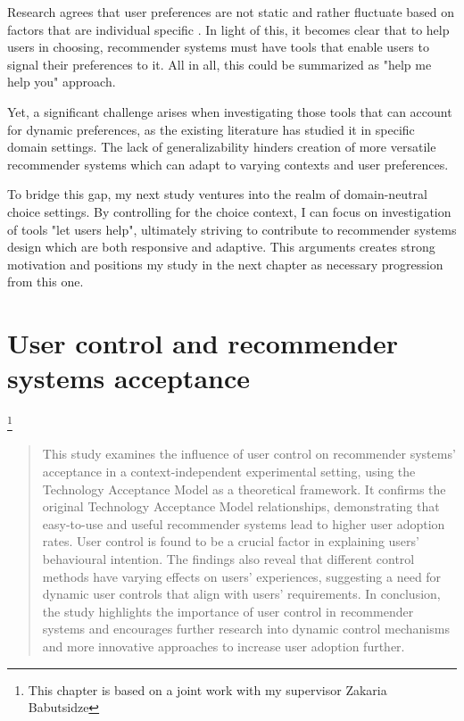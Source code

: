 \documentclass[a4paper,12pt]{article}
\begin{document}
Research agrees that user preferences are not static and rather fluctuate based on factors that are individual specific \citep{songWhenHowDiversify2019}. In light of this, it becomes clear that to help users in choosing, recommender systems must have tools that enable users to signal their preferences to it. All in all, this could be summarized as "help me help you" approach.

Yet, a significant challenge arises when investigating those tools that can account for dynamic preferences, as the existing literature has studied it in specific domain settings. The lack of generalizability hinders creation of more versatile recommender systems which can adapt to varying contexts and user preferences. 

To bridge this gap, my next study ventures into the realm of domain-neutral choice settings. By controlling for the choice context, I can focus on investigation of tools "let users help", ultimately striving to contribute to recommender systems design which are both responsive and adaptive. This arguments creates strong motivation and positions my study in the next chapter as necessary progression from this one.


\newpage


\section{User control and recommender systems acceptance}\label{chapter:UserControlAndRS}\footnote{This chapter is based on a joint work with my supervisor Zakaria Babutsidze}

\begin{abstract}

    This study examines the influence of user control on recommender systems' acceptance in a context-independent experimental setting, using the Technology Acceptance Model as a theoretical framework. It confirms the original  Technology Acceptance Model relationships, demonstrating that easy-to-use and useful recommender systems lead to higher user adoption rates. User control is found to be a crucial factor in explaining users' behavioural  intention. The findings also reveal that different control methods have varying effects on users' experiences, suggesting a need for dynamic user controls that align with users' requirements. In conclusion, the study highlights the importance of user control in recommender systems and encourages further research into dynamic control mechanisms and more innovative approaches to increase user adoption further.
    
\end{abstract}
\end{document}
